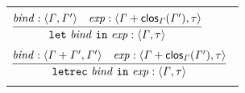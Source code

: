 \documentclass[final]{article}
\begin{document}
\begin{figure}[t]
\begin{small}
\begin{center}
\begin{tabular}{llll}


    \\
    &&&
    \\

    \multicolumn{4}{l}{
      $\MEMinferc
      {\MEMtyping{\CONSlet{\METAbind}{\METAexp}}{\METAityenv}{\METAity}}
      {\MEMtyping{\METAbind}{\METAityenv}{\METAityenv'}}
      {\MEMtyping{\METAexp}{\MEMplusenv{\METAityenv}{\MEMclos{\METAityenv}{\METAityenv'}}}{\METAity}}$
    }

    \\
    &&&
    \\

    \multicolumn{4}{l}{
      $\MEMinferc
      {\MEMtyping{\CONSletrec{\METAbind}{\METAexp}}{\METAityenv}{\METAity}}
      {\MEMtyping{\METAbind}{\MEMplusenv{\METAityenv}{\METAityenv'}}{\METAityenv'}}
      {\MEMtyping{\METAexp}{\MEMplusenv{\METAityenv}{\MEMclos{\METAityenv}{\METAityenv'}}}{\METAity}}$
    }

    \\
    &&&
    \\





\end{tabular}
\end{center}
\end{small}
\end{figure}
\end{document}
